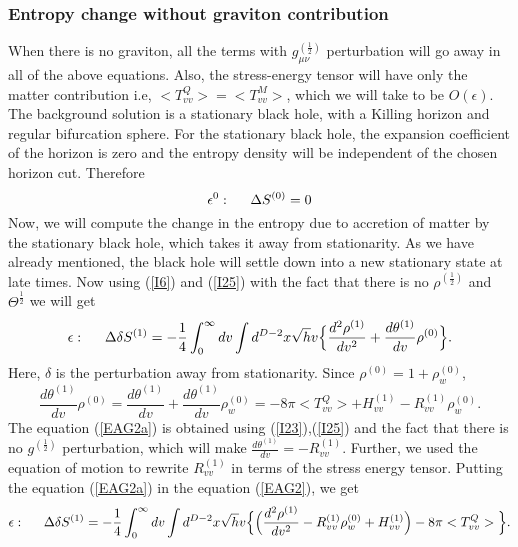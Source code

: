 \documentclass[12pt]{article}
\begin{document}
\subsubsection {Entropy change without graviton contribution}\label{EAG}
When there is no graviton, all the terms with $g_{\mu \nu}^{(\frac{1}{2})}$ perturbation will go away in all of the above equations. Also, the stress-energy tensor will have only the matter contribution i.e, $<T^{Q}_{vv}>= <T^{M}_{vv} > $, which we will take to be $O(\epsilon)$. The background solution is a stationary black hole, with a Killing horizon and regular bifurcation sphere. For the stationary black hole, the expansion coefficient of the horizon is zero and the entropy density will be independent of the chosen horizon cut.  Therefore
\begin{equation}\label{EAG1}
\epsilon^0: \hspace{5mm} \Delta S^{(0)}=0
\end{equation}
Now, we will compute the change in the entropy due to accretion of matter by the stationary black hole, which takes it away from stationarity. As we have already mentioned, the black hole will settle down into a new stationary state at late times.
 Now using (\ref{I6}) and (\ref{I25}) with the fact that there is no $\rho^{(\frac{1}{2})}$  and $\Theta^{\frac{1}{2}}$ we will get
\begin{equation}\label{EAG2}
\epsilon: \hspace{5mm} \Delta \delta S^{(1)}= -\frac{1}{4}\int_{0}^{\infty} dv \int  d^{D-2}x \sqrt{h} v \Big\{ \frac{d^2 \rho^{(1)} }{dv^2} + \frac{d\theta^{(1)}}{dv} \rho^{(0)}  \Big\}.
\end{equation}
Here, $\delta$ is the perturbation away from stationarity.
Since $\rho^{(0)} = 1 +\rho^{(0)}_w $,
\begin{equation}\label{EAG2a}
\frac{d\theta^{(1)}}{dv}\rho^{(0)}= \frac{d\theta^{(1)}}{dv}+\frac{d\theta^{(1)}}{dv}\rho^{(0)}_w =-8\pi<T_{vv}^{Q}>+H_{vv}^{(1)} -R_{vv}^{(1)}\rho^{(0)}_w .
\end{equation}
The equation (\ref{EAG2a}) is obtained using (\ref{I23}),(\ref{I25}) and the fact that there is no $g^{(\frac{1}{2})}$ perturbation, which will make $\frac{d\theta^{(1)}}{dv}=-R_{vv}^{(1)}$. Further, we used the equation of motion to rewrite $R_{vv}^{(1)}$ in terms of the stress energy tensor. Putting the equation (\ref{EAG2a}) in the equation (\ref{EAG2}), we get
\begin{equation}\label{EAG3}
\epsilon: \hspace{5mm} \Delta \delta S^{(1)}= -\frac{1}{4}\int_{0}^{\infty} dv \int  d^{D-2}x \sqrt{h} v \Big\{ \Big(\frac{d^2 \rho^{(1)} }{dv^2} - R^{(1)}_{vv} \rho^{(0)}_{w} + H^{(1)}_{vv}\Big) -8\pi<T^{Q}_{vv}>  \Big\}.
\end{equation}
\end{document}
